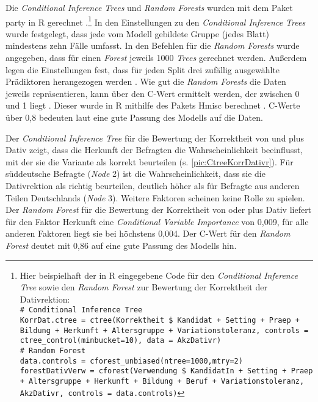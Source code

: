 \begin{sloppypar}
Die \textit{Conditional Inference Trees} und \textit{Random Forests} wurden mit dem Paket party in R gerechnet \citep[][Version 1.3-4]{Hothorn.2010}.\footnote{Hier beispielhaft der in R eingegebene Code für den \textit{Conditional Inference Tree} sowie den \textit{Random Forest} zur Bewertung der Korrektheit der Dativrektion:\\
\texttt{\# Conditional Inference Tree \\
KorrDat.ctree = ctree(Korrektheit \$ Kandidat + Setting + Praep + Bildung + Herkunft + Altersgruppe + Variationstoleranz, controls = ctree\_control(minbucket=10), data = AkzDativr)\\
\# Random Forest \\
data.controls = cforest\_unbiased(ntree=1000,mtry=2)\\
forestDativVerw = cforest(Verwendung \$ KandidatIn + Setting + Praep + Altersgruppe + Herkunft + Bildung + Beruf + Variationstoleranz, AkzDativr, controls = data.controls)}
}
In den Einstellungen zu den \textit{Conditional Inference Trees} wurde festgelegt, dass jede vom Modell gebildete Gruppe (jedes \glqq Blatt\grqq) mindestens zehn Fälle umfasst. 
In den Befehlen für die \textit{Random Forests} wurde angegeben, dass für einen \textit{Forest} jeweils 1000 \textit{Trees} gerechnet werden. 
Außerdem legen die Einstellungen fest, dass für jeden Split drei zufällig ausgewählte Prädiktoren herangezogen werden \citep[s.][297]{Levshina.2015}.
Wie gut die \textit{Random Forests} die Daten jeweils repräsentieren, kann über den C-Wert ermittelt werden, der zwischen 0 und 1 liegt \citep[s.][299]{Levshina.2015}. 
Dieser wurde in R mithilfe des Pakets Hmisc berechnet \citep[][Version 4.4-0]{Harrell.2020}.
C-Werte über 0,8 bedeuten laut \citet[156]{Tagliamonte.2012} eine gute Passung des Modells auf die Daten. 
\end{sloppypar}

\begin{sloppypar}
Der \textit{Conditional Inference Tree} für die Bewertung der Korrektheit von \wegen{} und \waehrend{} plus Dativ zeigt, dass die Herkunft der Befragten die Wahrscheinlichkeit beeinflusst, mit der sie die Variante als korrekt beurteilen (s. \autoref{pic:CtreeKorrDativr}). 
Für süddeutsche Befragte (\textit{Node} 2) ist die Wahrscheinlichkeit, dass sie die Dativrektion als richtig beurteilen, deutlich höher als für Befragte aus anderen Teilen Deutschlands (\textit{Node} 3). 
Weitere Faktoren scheinen keine Rolle zu spielen. 
Der \textit{Random Forest} für die Bewertung der Korrektheit von \wegen{} oder \waehrend{} plus Dativ liefert für den Faktor \glqq Herkunft\grqq{} eine \textit{Conditional Variable Importance} von 0,009, für alle anderen Faktoren liegt sie bei höchstens 0,004. 
Der C-Wert für den \textit{Random Forest} deutet mit 0,86 auf eine gute Passung des Modells hin. 
\end{sloppypar}


